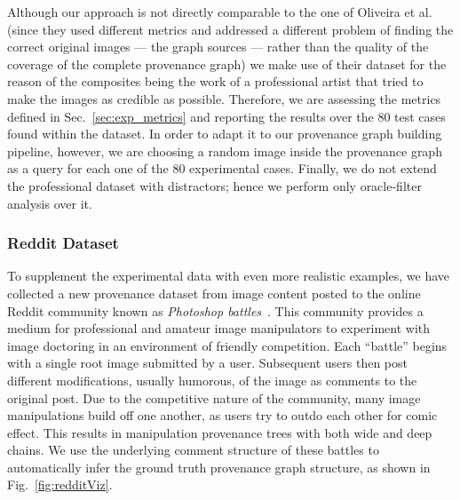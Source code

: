 Although our approach is not directly comparable to the one of Oliveira et al.~\cite{Oliveira_2016} (since they used different metrics and addressed a different problem of finding the correct original images --- the graph sources --- rather than the quality of the coverage of the complete provenance graph) we make use of their dataset for the reason of the composites being the work of a professional artist that tried to make the images as credible as possible.
Therefore, we are assessing the metrics defined in Sec.~\ref{sec:exp_metrics} and reporting the results over the 80 test cases found within the dataset.
In order to adapt it to our provenance graph building pipeline, however, we are choosing a random image inside the provenance graph as a query for each one of the 80 experimental cases.
Finally, we do not extend the professional dataset with distractors; hence we perform only oracle-filter analysis over it.

\vspace{0.2cm}
\subsubsection{Reddit Dataset}
To supplement the experimental data with even more realistic examples, we have collected a new provenance dataset from image content posted to the online Reddit community known as \emph{Photoshop battles}~\cite{reddit2017photoshopbattles}.
This community provides a medium for professional and amateur image manipulators to experiment with image doctoring in an environment of friendly competition.
Each ``battle'' begins with a single root image submitted by a user.
Subsequent users then post different modifications, usually humorous, of the image as comments to the original post.
Due to the competitive nature of the community, many image manipulations build off one another, as users try to outdo each other for comic effect.
This results in manipulation provenance trees with both wide and deep chains.
We use the underlying comment structure of these battles to automatically infer the ground truth provenance graph structure, as shown in Fig.~\ref{fig:redditViz}.

